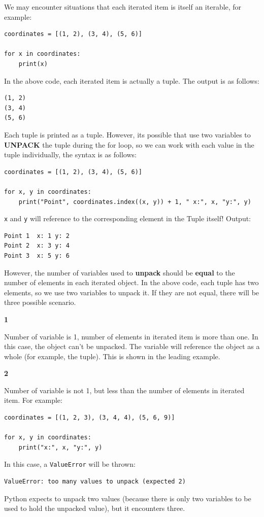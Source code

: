 \documentclass[12pt]{book}
\begin{document}
We may encounter situations that each iterated item is itself an iterable, for example:
\begin{verbatim}
coordinates = [(1, 2), (3, 4), (5, 6)]

for x in coordinates:
    print(x)
\end{verbatim}
In the above code, each iterated item is actually a tuple. The output is as follows:
\begin{verbatim}
(1, 2)
(3, 4)
(5, 6)
\end{verbatim}
Each tuple is printed as a tuple. However, its possible that use two variables to \textbf{UNPACK} the tuple during the for loop, so we can work with each value in the tuple individually, the syntax is as follows:
\begin{verbatim}
coordinates = [(1, 2), (3, 4), (5, 6)]

for x, y in coordinates:
    print("Point", coordinates.index((x, y)) + 1, " x:", x, "y:", y)
\end{verbatim}
\texttt{x} and \texttt{y} will reference to the corresponding element in the Tuple itself! Output:
\begin{verbatim}
Point 1  x: 1 y: 2
Point 2  x: 3 y: 4
Point 3  x: 5 y: 6
\end{verbatim}

However, the number of variables used to \textbf{unpack} should be \textbf{equal} to the number of elements in each iterated object. In the above code, each tuple has two elements, so we use two variables to unpack it. If they are not equal, there will be three possible scenario.

\textbf{1}

Number of variable is 1, number of elements in iterated item is more than one. In this case, the object can't be unpacked. The variable will reference the object as a whole (for example, the tuple). This is shown in the leading example.

\textbf{2}

Number of variable is not 1, but less than the number of elements in iterated item. For example:
\begin{verbatim}
coordinates = [(1, 2, 3), (3, 4, 4), (5, 6, 9)]

for x, y in coordinates:
    print("x:", x, "y:", y)
\end{verbatim}
In this case, a \texttt{ValueError} will be thrown:
\begin{verbatim}
ValueError: too many values to unpack (expected 2)
\end{verbatim}
Python expects to unpack two values (because there is only two variables to be used to hold the unpacked value), but it encounters three.
\end{document}
